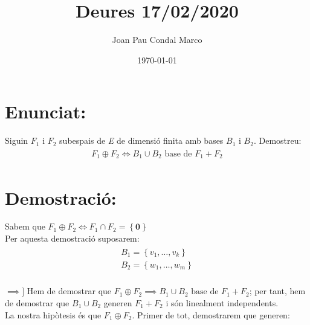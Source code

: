 \documentclass[a4paper, 11pt]{article}
\title{Deures 17/02/2020}
\author{Joan Pau Condal Marco}
\date{\today}
\begin{document}
    \maketitle
    \justify

    \section*{Enunciat:}
        Siguin ${F_1}$ i ${F_2}$ subespais de \emph{E} de dimensi\'o finita amb bases ${B_1}$ i ${B_2}$. Demostreu:
        \begin{align*}
            \begin{aligned}
                F_1 \oplus F_2 \iff B_1 \cup B_2 \text{ base de } F_1 + F_2
            \end{aligned}
        \end{align*}
    
        \section*{Demostraci\'o:}
            Sabem que ${F_1 \oplus F_2 \iff F_1 \cap F_2 = \left\{\mathbf{0}\right\}}$\\
            Per aquesta demostraci\'o suposarem:
            \begin{align*}
                \begin{aligned}
                    B_1 = \left\{v_1,\dots,v_k\right\}\\
                    B_2 = \left\{w_1,\dots,w_m\right\}
                \end{aligned}
            \end{align*}
            \\
            ${\mathbf{\implies]}}$ Hem de demostrar que ${F_1 \oplus F_2 \implies B_1 \cup B_2 \text{ base de } F_1 + F_2}$; per tant, hem de demostrar que ${B_1 \cup B_2}$ generen ${F_1 + F_2}$ i s\'on linealment independents.\\
            La nostra hip\`otesis \'es que ${F_1 \oplus F_2}$. Primer de tot, demostrarem que generen:
\end{document}
